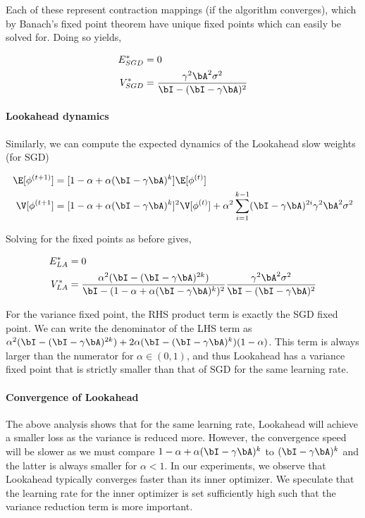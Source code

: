 Each of these represent contraction mappings (if the algorithm converges), which by Banach's fixed point theorem have unique fixed points which can easily be solved for. Doing so yields,

\begin{align}
    E_{SGD}^* &= 0 \\
    V_{SGD}^* &= \frac{\gamma^2 \bA^2 \sigma^2}{\bI - (\bI - \gamma \bA)^2}
\end{align}

\paragraph{Lookahead dynamics} Similarly, we can compute the expected dynamics of the Lookahead slow weights (for SGD)

\begin{align}
    \E[\phi^{(t+1)}] &= [1 - \alpha + \alpha(\bI - \gamma\bA)^k]\E[\phi^{(t)}] \\
    \V[\phi^{(t+1}] &= [1 - \alpha + \alpha(\bI - \gamma\bA)^k]^2 \V[\phi^{(t)}] + \alpha^2 \sum_{i=1}^{k-1} (\bI - \gamma\bA)^{2i}\gamma^2\bA^2\sigma^2
\end{align}

Solving for the fixed points as before gives,

\begin{align}
    E_{LA}^* &= 0 \\
    V_{LA}^* &= \frac{\alpha^2 (\bI - (\bI - \gamma\bA)^{2k})}{\bI - (1 - \alpha + \alpha(\bI - \gamma\bA)^k)^2} \frac{\gamma^2 \bA^2 \sigma^2}{\bI - (\bI - \gamma \bA)^2}
\end{align}

For the variance fixed point, the RHS product term is exactly the SGD fixed point. We can write the denominator of the LHS term as $\alpha^2 (\bI - (\bI - \gamma\bA)^{2k}) + 2\alpha(\bI - (\bI - \gamma\bA)^k)(1-\alpha)$. This term is always larger than the numerator for $\alpha \in (0,1)$, and thus Lookahead has a variance fixed point that is strictly smaller than that of SGD for the same learning rate. 

\paragraph{Convergence of Lookahead} The above analysis shows that for the same learning rate, Lookahead will achieve a smaller loss as the variance is reduced more. However, the convergence speed will be slower as we must compare $1-\alpha + \alpha(\bI-\gamma\bA)^k$ to $(\bI-\gamma\bA)^k$ and the latter is always smaller for $\alpha < 1$. In our experiments, we observe that Lookahead typically converges faster than its inner optimizer. We speculate that the learning rate for the inner optimizer is set sufficiently high such that the variance reduction term is more important.

